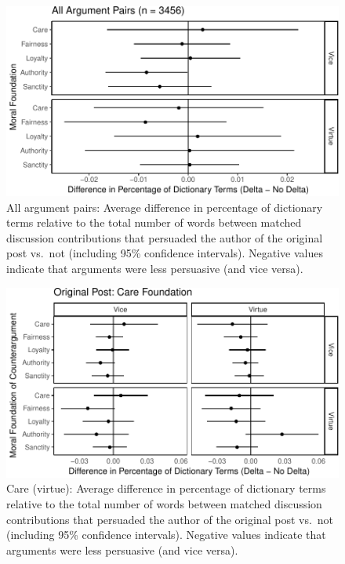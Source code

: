 \documentclass[12pt,]{article}
\begin{document}
\begin{figure}
\centering
\includegraphics{prelim_files/figure-latex/check all discussion pairs-1.pdf}
\caption{All argument pairs: Average difference in percentage of
dictionary terms relative to the total number of words between matched
discussion contributions that persuaded the author of the original post
vs.~not (including 95\% confidence intervals). Negative values indicate
that arguments were less persuasive (and vice versa).}
\end{figure}

\begin{figure}
\centering
\includegraphics{prelim_files/figure-latex/harm virtue-1.pdf}
\caption{Care (virtue): Average difference in percentage of dictionary
terms relative to the total number of words between matched discussion
contributions that persuaded the author of the original post vs.~not
(including 95\% confidence intervals). Negative values indicate that
arguments were less persuasive (and vice versa).}
\end{figure}
\end{document}
